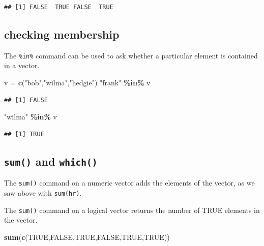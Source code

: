 \documentclass[
]{book}
\newenvironment{Shaded}{\begin{snugshade}}{\end{snugshade}}
\newcommand{\ConstantTok}[1]{\textcolor[rgb]{0.56,0.35,0.01}{#1}}
\newcommand{\FunctionTok}[1]{\textcolor[rgb]{0.13,0.29,0.53}{\textbf{#1}}}
\newcommand{\NormalTok}[1]{#1}
\newcommand{\OtherTok}[1]{\textcolor[rgb]{0.56,0.35,0.01}{#1}}
\newcommand{\SpecialCharTok}[1]{\textcolor[rgb]{0.81,0.36,0.00}{\textbf{#1}}}
\newcommand{\StringTok}[1]{\textcolor[rgb]{0.31,0.60,0.02}{#1}}
\theoremstyle{definition}
\theoremstyle{definition}
\theoremstyle{definition}
\theoremstyle{definition}
\theoremstyle{remark}
\begin{document}
\begin{verbatim}
## [1] FALSE  TRUE FALSE  TRUE
\end{verbatim}

\subsection*{checking membership}\label{checking-membership}

The \texttt{\%in\%} command can be used to ask whether a particular element is contained in a vector.

\begin{Shaded}
\begin{Highlighting}[]
\NormalTok{v }\OtherTok{=} \FunctionTok{c}\NormalTok{(}\StringTok{"bob"}\NormalTok{,}\StringTok{"wilma"}\NormalTok{,}\StringTok{"hedgie"}\NormalTok{)}
\StringTok{"frank"} \SpecialCharTok{\%in\%}\NormalTok{ v}
\end{Highlighting}
\end{Shaded}

\begin{verbatim}
## [1] FALSE
\end{verbatim}

\begin{Shaded}
\begin{Highlighting}[]
\StringTok{"wilma"} \SpecialCharTok{\%in\%}\NormalTok{ v}
\end{Highlighting}
\end{Shaded}

\begin{verbatim}
## [1] TRUE
\end{verbatim}

\subsection*{\texorpdfstring{\texttt{sum()} and \texttt{which()}}{sum() and which()}}\label{sum-and-which}

The \texttt{sum()} command on a numeric vector adds the elements of the vector, as we saw above with \texttt{sum(hr)}.

The \texttt{sum()} command on a logical vector returns the number of TRUE elements in the vector.

\begin{Shaded}
\begin{Highlighting}[]
\FunctionTok{sum}\NormalTok{(}\FunctionTok{c}\NormalTok{(}\ConstantTok{TRUE}\NormalTok{,}\ConstantTok{FALSE}\NormalTok{,}\ConstantTok{TRUE}\NormalTok{,}\ConstantTok{FALSE}\NormalTok{,}\ConstantTok{TRUE}\NormalTok{,}\ConstantTok{TRUE}\NormalTok{))}
\end{Highlighting}
\end{Shaded}
\end{document}
